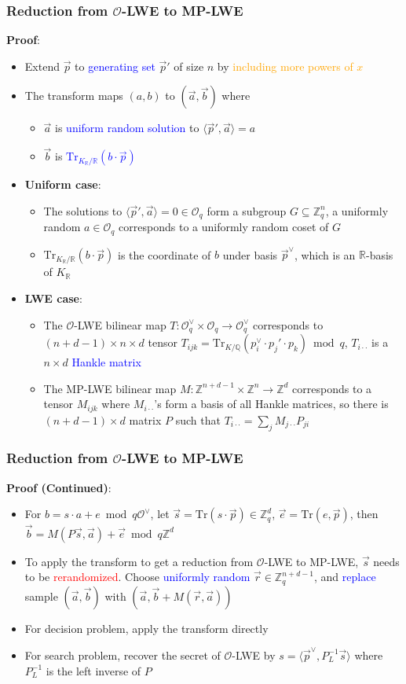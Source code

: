 \documentclass{beamer}
\newcommand{\blue}[1]{\textcolor{blue}{#1}}
\newcommand{\orange}[1]{\textcolor{orange}{#1}}
\newcommand{\red}[1]{\textcolor{red}{#1}}
\newcommand{\cO}{\mathcal{O}}
\newcommand{\bbR}{\mathbb{R}}
\newcommand{\bbZ}{\mathbb{Z}}
\newcommand{\Tr}{\mathrm{Tr}}
\newcommand{\TrKQ}{\mathrm{Tr}_{K/\mathbb{Q}}}
\newcommand{\TrKRR}{\mathrm{Tr}_{K_{\mathbb{R}}/\mathbb{R}}}
\newcommand{\cOV}{\mathcal{O}^{\vee}}
\newcommand{\KR}{K_{\mathbb{R}}}
\newcommand{\va}{\vec{a}}
\newcommand{\vb}{\vec{b}}
\newcommand{\ve}{\vec{e}}
\newcommand{\vp}{\vec{p}}
\newcommand{\vr}{\vec{r}}
\newcommand{\vs}{\vec{s}}
\newcommand{\vpV}{\vec{p}^{\vee}}
\begin{document}
\frame
{
  \frametitle{Reduction from $\cO$-LWE to MP-LWE}
  \textbf{Proof}:
  \begin{itemize}
  	\item Extend $\vp$ to \blue{generating set} $\vp'$ of size $n$ by \orange{including more powers of $x$}
  	\item The transform maps $(a,b)$ to $(\va,\vb)$ where
	  	\begin{itemize}
	  		\item $\va$ is \blue{uniform random solution} to $\langle\vp',\va\rangle=a$
	  		\item $\vb$ is \blue{$\TrKRR(b\cdot\vp)$}
	  	\end{itemize}
	  \item \textbf{Uniform case}:
	  	\begin{itemize}
	  		\item The solutions to $\langle\vp',\va\rangle=0\in\cO_q$ form a subgroup $G\subseteq\bbZ_q^n$, a uniformly random $a\in\cO_q$ corresponds to a uniformly random coset of $G$
	  		\item $\TrKRR(b\cdot\vp)$ is the coordinate of $b$ under basis $\vpV$, which is an $\bbR$-basis of $\KR$
	  	\end{itemize}
	  \item \textbf{LWE case}:
	  	\begin{itemize}
	  		\item The $\cO$-LWE bilinear map $T:\cOV_q\times\cO_q\to\cOV_q$ corresponds to $(n+d-1)\times n\times d$ tensor $T_{ijk}=\TrKQ(p_i^{\vee}\cdot p_j'\cdot p_k)\bmod q$, $T_{i\cdot\cdot}$ is a $n\times d$ \blue{Hankle matrix}
	  		\item The MP-LWE bilinear map $M:\bbZ^{n+d-1}\times\bbZ^n\to\bbZ^d$ corresponds to a tensor $M_{ijk}$ where $M_{i\cdot\cdot}$'s form a basis of all Hankle matrices, so there is $(n+d-1)\times d$ matrix $P$ such that $T_{i\cdot\cdot}=\sum_{j}M_{j\cdot\cdot}P_{ji}$
	  	\end{itemize}
  \end{itemize}
}

\frame
{
  \frametitle{Reduction from $\cO$-LWE to MP-LWE}
  \textbf{Proof (Continued)}:
  \begin{itemize}
  	\item For $b=s\cdot a+e\bmod q\cOV$, let $\vs=\Tr(s\cdot\vp)\in\bbZ_q^d$, $\ve=\Tr(e,\vp)$, then $\vb=M(P\vs,\va)+\ve\bmod q\bbZ^d$
  	\item To apply the transform to get a reduction from $\cO$-LWE to MP-LWE, $\vs$ needs to be \red{rerandomized}. Choose \blue{uniformly random} $\vr\in\bbZ_q^{n+d-1}$, and \blue{replace} sample $(\va,\vb)$ with $(\va,\vb+M(\vr,\va))$
  	\item For decision problem, apply the transform directly
  	\item For search problem, recover the secret of $\cO$-LWE by $s=\langle\vpV,P_L^{-1}\vs\rangle$ where $P_L^{-1}$ is the left inverse of $P$
  \end{itemize}
}
\end{document}
